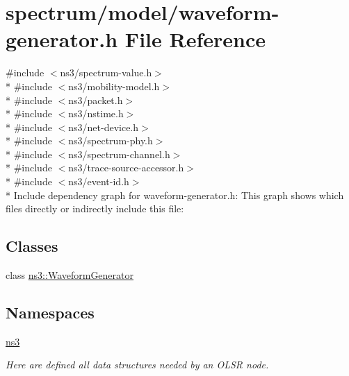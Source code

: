 \hypertarget{waveform-generator_8h}{}\section{spectrum/model/waveform-\/generator.h File Reference}
\label{waveform-generator_8h}
{\ttfamily \#include $<$ns3/spectrum-\/value.\+h$>$}\\*
{\ttfamily \#include $<$ns3/mobility-\/model.\+h$>$}\\*
{\ttfamily \#include $<$ns3/packet.\+h$>$}\\*
{\ttfamily \#include $<$ns3/nstime.\+h$>$}\\*
{\ttfamily \#include $<$ns3/net-\/device.\+h$>$}\\*
{\ttfamily \#include $<$ns3/spectrum-\/phy.\+h$>$}\\*
{\ttfamily \#include $<$ns3/spectrum-\/channel.\+h$>$}\\*
{\ttfamily \#include $<$ns3/trace-\/source-\/accessor.\+h$>$}\\*
{\ttfamily \#include $<$ns3/event-\/id.\+h$>$}\\*
Include dependency graph for waveform-\/generator.h\+:
This graph shows which files directly or indirectly include this file\+:
\subsection*{Classes}
\begin{DoxyCompactItemize}
\item 
class \hyperlink{classns3_1_1WaveformGenerator}{ns3\+::\+Waveform\+Generator}
\end{DoxyCompactItemize}
\subsection*{Namespaces}
\begin{DoxyCompactItemize}
\item 
 \hyperlink{namespacens3}{ns3}
\begin{DoxyCompactList}\small\item\em Here are defined all data structures needed by an O\+L\+SR node. \end{DoxyCompactList}\end{DoxyCompactItemize}
